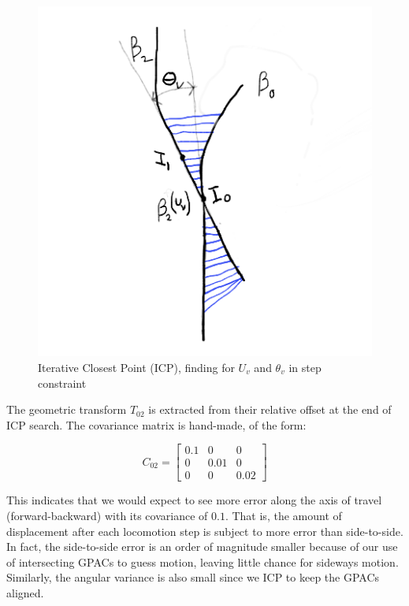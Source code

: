 \begin{figure}
  \begin{center}
    \includegraphics[scale=0.8]{5_step_ICP.png}
  \end{center}
  \caption{Iterative Closest Point (ICP), finding for $U_v$ and $\theta_v$ in step constraint}
	\label{fig:step_ICP}
\end{figure}


The geometric transform $T_{02}$ is extracted from their relative offset at the end of ICP search.  The covariance matrix is hand-made, of the form:

\begin{equation}
C_{02} = 
\begin{bmatrix}
0.1 & 0 & 0 \\
0 & 0.01 & 0 \\
0 & 0 & 0.02
\end{bmatrix}
\end{equation}

This indicates that we would expect to see more error along the axis of travel (forward-backward) with its covariance of $0.1$.  That is, the amount of displacement after each locomotion step is subject to more error than side-to-side.   In fact, the side-to-side error is an order of magnitude smaller because of our use of intersecting GPACs to guess motion, leaving little chance for sideways motion.   Similarly, the angular variance is also small since we ICP to keep the GPACs aligned. 

